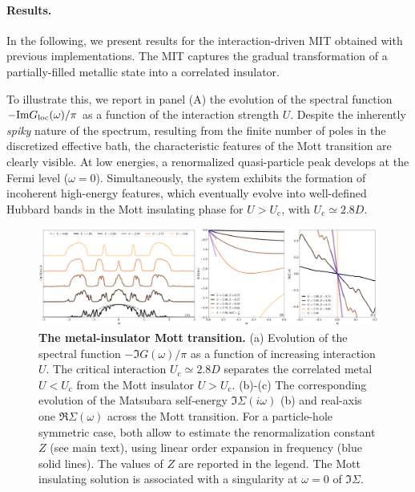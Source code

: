 \documentclass[edipack_sp.tex]{subfiles}
\begin{document}
\paragraph{Results.}
In the following, we present \NAME results for the interaction-driven MIT obtained with previous implementations. The MIT captures the gradual transformation of a partially-filled metallic state into a correlated insulator.

To illustrate this, we report in panel (A) the evolution of the spectral function $-{\rm Im}G_\mathrm{loc}(\omega)/\pi$ as a function of the  interaction strength $U$. 
Despite the inherently {\it spiky} nature of the spectrum, resulting from the finite number of poles in the 
discretized effective bath, the characteristic features of the Mott 
transition are clearly visible. At low energies, a renormalized 
quasi-particle peak develops at the Fermi level ($\omega = 0$). 
Simultaneously, the system exhibits the formation of incoherent 
high-energy features, which eventually evolve into well-defined 
Hubbard bands in the Mott insulating phase for $U > U_\mathrm{c}$, 
with $U_\mathrm{c} \simeq 2.8D$.

\begin{figure}[t!]
  \includegraphics[width=\linewidth]{figures/figBethe.pdf}
    \caption{\label{figEx1}%
      \textbf{The metal-insulator Mott transition.}
      (a) Evolution of the spectral function $-\Im{G}(\omega)/\pi$ as
      a function of increasing interaction $U$. The critical
      interaction $U_\mathrm{c}\simeq 2.8D$ separates the correlated metal $U<U_\mathrm{c}$ from
      the Mott insulator $U>U_\mathrm{c}$.
      (b)-(c) The corresponding evolution of the Matsubara self-energy
      $\Im\Sigma(i\omega)$ (b) and
      real-axis one $\Re\Sigma(\omega)$ across the Mott
      transition. For a particle-hole symmetric case, both allow to
      estimate the renormalization constant $Z$ (see main text), using
      linear order expansion in frequency (blue solid lines). The
      values of $Z$ are reported in the legend.
      The Mott insulating solution is associated with a singularity at
      $\omega=0$ of $\Im\Sigma$.
    }
\end{figure}
\end{document}
